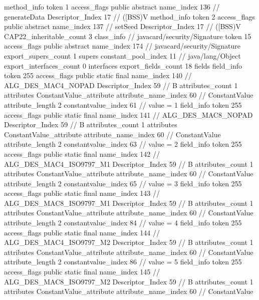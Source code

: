{{{{{				}
				method_info {
					token	1
					access_flags	public abstract
					name_index	136		// generateData
					Descriptor_Index	17		// ([BSS)V
				}
				method_info {
					token	2
					access_flags	public abstract
					name_index	137		// setSeed
					Descriptor_Index	17		// ([BSS)V
				}
			}
			CAP22_inheritable_count	3
		}
		class_info {		// javacard/security/Signature
			token	15
			access_flags	public abstract
			name_index	174		// javacard/security/Signature
			export_supers_count	1
			supers {
				constant_pool_index	11		// java/lang/Object
			}
			export_interfaces_count	0
			interfaces {
			}
			export_fields_count	18
			fields {
			field_info {
				token	255
				access_flags	public static final
				name_index	140		// ALG_DES_MAC4_NOPAD
				Descriptor_Index	59		// B
				attributes_count	1
				attributes {
				ConstantValue_attribute {
					attribute_name_index	60		// ConstantValue
					attribute_length	2
					constantvalue_index	61		// value = 1
				}
				}
			}
			field_info {
				token	255
				access_flags	public static final
				name_index	141		// ALG_DES_MAC8_NOPAD
				Descriptor_Index	59		// B
				attributes_count	1
				attributes {
				ConstantValue_attribute {
					attribute_name_index	60		// ConstantValue
					attribute_length	2
					constantvalue_index	63		// value = 2
				}
				}
			}
			field_info {
				token	255
				access_flags	public static final
				name_index	142		// ALG_DES_MAC4_ISO9797_M1
				Descriptor_Index	59		// B
				attributes_count	1
				attributes {
				ConstantValue_attribute {
					attribute_name_index	60		// ConstantValue
					attribute_length	2
					constantvalue_index	65		// value = 3
				}
				}
			}
			field_info {
				token	255
				access_flags	public static final
				name_index	143		// ALG_DES_MAC8_ISO9797_M1
				Descriptor_Index	59		// B
				attributes_count	1
				attributes {
				ConstantValue_attribute {
					attribute_name_index	60		// ConstantValue
					attribute_length	2
					constantvalue_index	84		// value = 4
				}
				}
			}
			field_info {
				token	255
				access_flags	public static final
				name_index	144		// ALG_DES_MAC4_ISO9797_M2
				Descriptor_Index	59		// B
				attributes_count	1
				attributes {
				ConstantValue_attribute {
					attribute_name_index	60		// ConstantValue
					attribute_length	2
					constantvalue_index	86		// value = 5
				}
				}
			}
			field_info {
				token	255
				access_flags	public static final
				name_index	145		// ALG_DES_MAC8_ISO9797_M2
				Descriptor_Index	59		// B
				attributes_count	1
				attributes {
				ConstantValue_attribute {
					attribute_name_index	60		// ConstantValue
}}}}}}}
